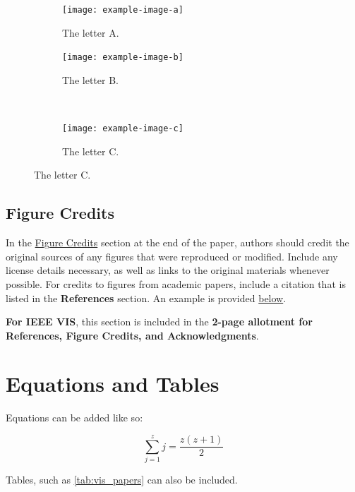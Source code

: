 \documentclass[journal]{vgtc}                %
\begin{document}
\begin{figure}[tbp]
  \centering
  \begin{subfigure}[b]{0.45\columnwidth}
  	\centering
  	\texttt{[image: example-image-a]}
  	\caption{The letter A.}
  	\label{fig:ex_subfigs_a}
  \end{subfigure}%
  \hfill%
  \begin{subfigure}[b]{0.45\columnwidth}
  	\centering
  	\texttt{[image: example-image-b]}
  	\caption{The letter B.}
  	\label{fig:ex_subfigs_b}
  \end{subfigure}%
  \\%
  \begin{subfigure}[b]{0.45\columnwidth}
  	\centering
  	\texttt{[image: example-image-c]}
  	\caption{The letter C.}
  	\label{fig:ex_subfigs_c}
  \end{subfigure}%
  \label{fig:ex_subfigs}
\end{figure}

\subsection{Figure Credits}
\label{sec:figure_credits_inst}

In the \hyperref[sec:figure_credits]{Figure Credits} section at the end of the paper, authors should credit the original sources of any figures that were reproduced or modified.
Include any license details necessary, as well as links to the original materials whenever possible.
For credits to figures from academic papers, include a citation that is listed in the \textbf{References} section.
An example is provided \hyperref[sec:figure_credits]{below}.

\textbf{For IEEE VIS}, this section is included in the \textbf{2-page allotment for References, Figure Credits, and Acknowledgments}.



\section{Equations and Tables}

Equations can be added like so:

\begin{equation}
  \label{eq:sum}
  \sum_{j=1}^{z} j = \frac{z(z+1)}{2}
\end{equation}

Tables, such as \cref{tab:vis_papers} can also be included.
\end{document}
